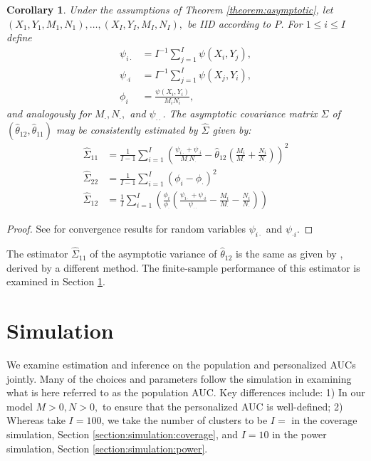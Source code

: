 \documentclass[12pt]{article}
\DeclareMathOperator{\AUC}{AUC}
\newcommand{\I}{I}
\renewcommand{\P}{P}
\newcommand{\cind}{\perp \!\!\! \perp}
\newcommand{\aucindivhat}{\hat{\theta}_{11}}%
\newcommand{\aucpophat}{\hat{\theta}_{12}}%
\newcommand{\kernel}{\psi}
\newcommand{\Kernel}{\psi}
\renewcommand{\d}{\phi}
\newtheorem{corollary}[theorem]{Corollary}
\begin{document}
\begin{corollary}\label{corollary:variance estimator}
  Under the assumptions of Theorem \ref{theorem:asymptotic}, let
  $(X_1,Y_1,M_1,N_1),\ldots,(X_\I,Y_\I,M_\I,N_\I),$ be IID according
  to $\P$. For $1\le i\le \I$ define
  \begin{align}
    \kernel_{i\cdot}&=I^{-1}\sum_{j=1}^\I \kernel(X_i,Y_j),\\
    \kernel_{\cdot i}&=I^{-1}\sum_{j=1}^\I \kernel(X_j,Y_i),\\
    \phi_i &= \frac{\kernel(X_i,Y_i)}{M_iN_i},
  \end{align}
  and analogously for $M_\cdot,N_\cdot,$ and $\kernel_{\cdot\cdot}$. The asymptotic covariance matrix
  $\Sigma$ of $(\aucpophat,\aucindivhat)$ may be consistently
  estimated by $\hat{\Sigma}$ given by:
  \begin{align}
    \hat{\Sigma}_{11} &=\frac{1}{\I-1}\sum_{i=1}^\I\left( \frac{\Kernel_{i\cdot}+\Kernel_{\cdot i}}{M_\cdot N_\cdot}-\aucpophat\left(\frac{M_i}{M_\cdot}+\frac{N_i}{N_\cdot}\right) \right)^2\\
    \hat{\Sigma}_{22} &= \frac{1}{\I-1}\sum_{i=1}^\I(\d_i-\d_\cdot)^2\\
    \hat{\Sigma}_{12} &=\frac{1}{\I}\sum_{i=1}^\I\left(\frac{\d_{i}}{\d_{\cdot}}\left(\frac{\Kernel_{i\cdot}+\Kernel_{\cdot i}}{\Kernel_{\cdot\cdot}} - \frac{M_i}{M_\cdot}-\frac{N_i}{N_\cdot}   \right) \right) %
  \end{align}
\end{corollary}
\begin{proof}
  See \citet{sen1960} for convergence results for random variables $\Kernel_{i\cdot}$ and $\Kernel_{\cdot i}.$
\end{proof}
The estimator $\hat{\Sigma}_{11}$ of the asymptotic variance of $\aucpophat$ is the same as given by \citet{obuchowski1997}, derived by a different method. The finite-sample performance of this estimator is examined in Section \ref{section:simulation}.



\section{Simulation}\label{section:simulation}

We examine estimation and inference on the population and personalized
AUCs jointly. Many of the choices and parameters follow the simulation
in \citet{obuchowski1997} examining what is here referred to as the
population AUC. Key differences include: 1) In our model
$M>0,N>0,$ to ensure that the personalized AUC is well-defined; 2) Whereas
\citet{obuchowski1997} take $\I=100$, we take the number of clusters to be $\I=$ in the coverage simulation, Section \ref{section:simulation:coverage}, and $\I=10$ in the power simulation, Section \ref{section:simulation:power}.
\end{document}
